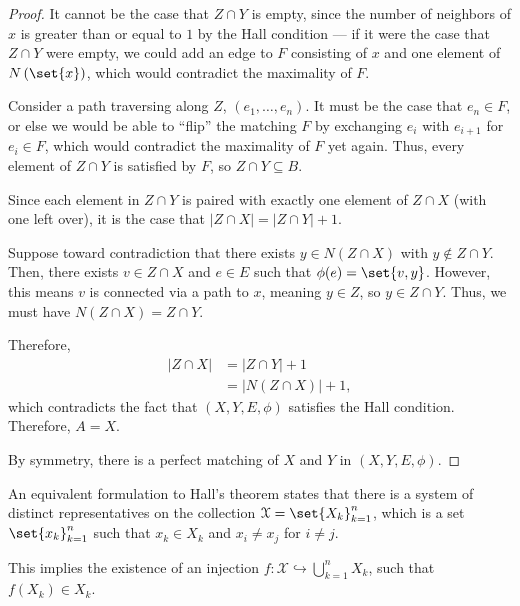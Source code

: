 \documentclass[10pt]{mypackage2}
\begin{document}
\begin{proof}
  It cannot be the case that $Z\cap Y$ is empty, since the number of neighbors of $x$ is greater than or equal to $1$ by the Hall condition --- if it were the case that $Z\cap Y$ were empty, we could add an edge to $F$ consisting of $x$ and one element of $N\left(\set{x}\right)$, which would contradict the maximality of $F$.\newline

  Consider a path traversing along $Z$, $\left(e_1,\dots,e_n\right)$. It must be the case that $e_n\in F$, or else we would be able to ``flip'' the matching $F$ by exchanging $e_{i}$ with $e_{i+1}$ for $e_i\in F$, which would contradict the maximality of $F$ yet again. Thus, every element of $Z\cap Y$ is satisfied by $F$, so $Z\cap Y\subseteq B$.\newline

  Since each element in $Z\cap Y$ is paired with exactly one element of $Z\cap X$ (with one left over), it is the case that $\left\vert Z\cap X \right\vert = \left\vert Z\cap Y \right\vert + 1$.\newline

  Suppose toward contradiction that there exists $y\in N\left(Z\cap X\right)$ with $y\notin Z\cap Y$. Then, there exists $v\in Z\cap X$ and $e\in E$ such that $\phi(e) = \set{v,y}$. However, this means $v$ is connected via a path to $x$, meaning $y\in Z$, so $y\in Z\cap Y$. Thus, we must have $N\left(Z\cap X\right) = Z\cap Y$.\newline

  Therefore,
  \begin{align*}
    \left\vert Z\cap X \right\vert &= \left\vert Z\cap Y \right\vert + 1\\
                                   &= \left\vert N\left(Z\cap X\right) \right\vert + 1,
  \end{align*}
  which contradicts the fact that $\left(X,Y,E,\phi\right)$ satisfies the Hall condition. Therefore, $A = X$.\newline

  By symmetry, there is a perfect matching of $X$ and $Y$ in $\left(X,Y,E,\phi\right)$.
\end{proof}
\begin{remark}
  An equivalent formulation to Hall's theorem states that there is a system of distinct representatives on the collection $\mathcal{X} = \set{X_k}_{k=1}^{n}$, which is a set $\set{x_{k}}_{k=1}^{n}$ such that $x_{k}\in X_{k}$ and $x_{i}\neq x_j$ for $i\neq j$.\newline

  This implies the existence of an injection $f\colon \mathcal{X}\hookrightarrow \bigcup_{k=1}^{n}X_{k}$, such that $f\left(X_k\right) \in X_k$.
\end{remark}
\end{document}

